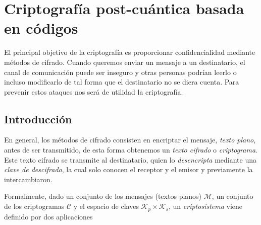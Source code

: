 

\chapter{Criptografía post-cuántica basada en códigos}



El principal objetivo de la criptografía es proporcionar confidencialidad mediante métodos de cifrado. Cuando queremos enviar un mensaje a un destinatario, el canal de comunicación puede ser inseguro y otras personas podrían leerlo o incluso modificarlo de tal forma que el destinatario no se diera cuenta. Para prevenir estos ataques nos será de utilidad la criptografía.


\section{Introducción}

En general, los métodos de cifrado consisten en encriptar el mensaje, \emph{texto plano}, antes de ser transmitido, de esta forma obtenemos un \emph{texto cifrado} o \emph{criptograma}. Este texto cifrado se transmite al destinatario, quien lo \emph{desencripta} mediante una \emph{clave de descifrado}, la cual solo conocen el receptor y el emisor y previamente la intercambiaron.

Formalmente, dado un conjunto de los mensajes (textos planos) $\mathcal{M}$, un conjunto de los criptogramas $\mathcal{C}$ y el espacio de claves $\mathcal{K}_p \times \mathcal{K}_s$, un \emph{criptosistema} viene definido por dos aplicaciones

